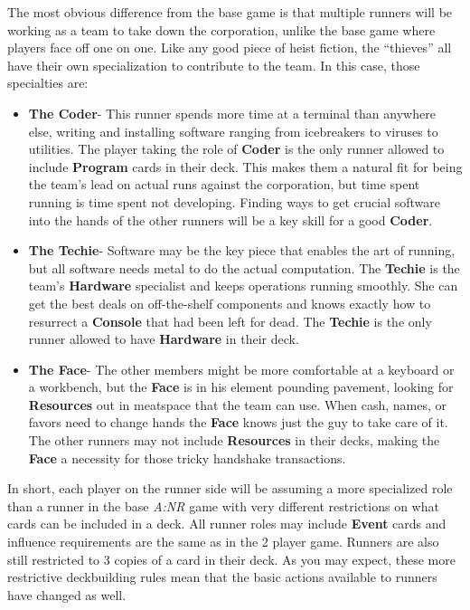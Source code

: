 \documentclass[titlepage]{article}
\begin{document}
			The most obvious difference from the base game is that multiple runners will be working as a team to take down the corporation, unlike the base game where players face off one on one. Like any good piece of heist fiction, the ``thieves'' all have their own specialization to contribute to the team. In this case, those specialties are:
			\begin{itemize}
				\item \textbf{The Coder}-
					This runner spends more time at a terminal than anywhere else, writing and installing software ranging from icebreakers to viruses to utilities. The player taking the role of \textbf{Coder} is the only runner allowed to include \textbf{Program} cards in their deck. This makes them a natural fit for being the team's lead on actual runs against the corporation, but time spent running is time spent not developing. Finding ways to get crucial software into the hands of the other runners will be a key skill for a good \textbf{Coder}.
				\item \textbf{The Techie}-
					Software may be the key piece that enables the art of running, but all software needs metal to do the actual computation. The \textbf{Techie} is the team's \textbf{Hardware} specialist and keeps operations running smoothly. She can get the best deals on off-the-shelf components and knows exactly how to resurrect a \textbf{Console} that had been left for dead. The \textbf{Techie} is the only runner allowed to have \textbf{Hardware} in their deck.
				\item \textbf{The Face}-
					The other members might be more comfortable at a keyboard or a workbench, but the \textbf{Face} is in his element pounding pavement, looking for \textbf{Resources} out in meatspace that the team can use. When cash, names, or favors need to change hands the \textbf{Face} knows just the guy to take care of it. The other runners may not include \textbf{Resources} in their decks, making the \textbf{Face} a necessity for those tricky handshake transactions.

				\end{itemize}

				In short, each player on the runner side will be assuming a more specialized role than a runner in the base \emph{A:NR} game with very different restrictions on what cards can be included in a deck. All runner roles may include \textbf{Event} cards and influence requirements are the same as in the 2 player game. Runners are also still restricted to 3 copies of a card in their deck. As you may expect, these more restrictive deckbuilding rules mean that the basic actions available to runners have changed as well.
\end{document}
